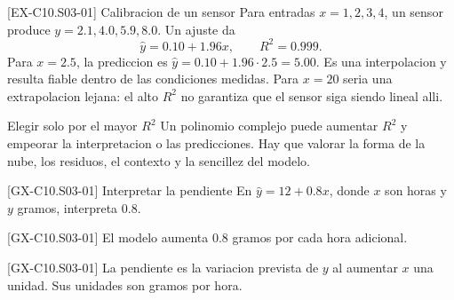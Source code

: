 \begin{solvedexample}{[EX-C10.S03-01] Calibracion de un sensor}
Para entradas \(x=1,2,3,4\), un sensor produce \(y=2.1,4.0,5.9,8.0\). Un ajuste da
\[
\hat y=0.10+1.96x,\qquad R^2=0.999.
\]
Para \(x=2.5\), la prediccion es \(\hat y=0.10+1.96\cdot2.5=5.00\). Es una interpolacion y
resulta fiable dentro de las condiciones medidas. Para \(x=20\) seria una extrapolacion lejana:
el alto \(R^2\) no garantiza que el sensor siga siendo lineal alli.
\end{solvedexample}

\begin{commonerror}{Elegir solo por el mayor \(R^2\)}
Un polinomio complejo puede aumentar \(R^2\) y empeorar la interpretacion o las predicciones.
Hay que valorar la forma de la nube, los residuos, el contexto y la sencillez del modelo.
\end{commonerror}

\begin{guidedexercise}{[GX-C10.S03-01] Interpretar la pendiente}
En \(\hat y=12+0.8x\), donde \(x\) son horas y \(y\) gramos, interpreta \(0.8\).
\end{guidedexercise}
\begin{shortanswer}{[GX-C10.S03-01]} El modelo aumenta \(0.8\) gramos por cada hora adicional. \end{shortanswer}
\begin{fullsolution}{[GX-C10.S03-01]}
La pendiente es la variacion prevista de \(y\) al aumentar \(x\) una unidad. Sus unidades son
gramos por hora.
\end{fullsolution}


